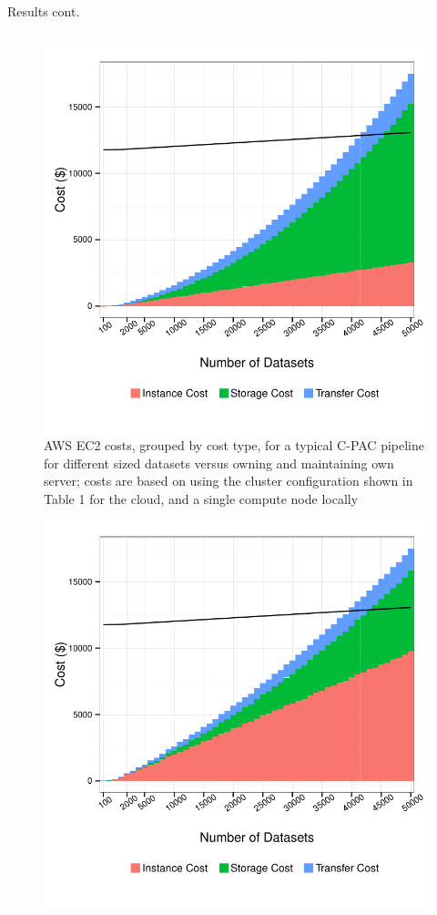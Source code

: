 \documentclass[final,hyperref={pdfpagelabels=false}]{beamer}
\begin{document}
\begin{frame}
\begin{columns}
\begin{column}{.5\textwidth}
{\begin{block}{Results cont.}
\begin{column}{.47\textwidth}
\begin{figure}
                  \includegraphics[width=.99\textwidth]{cpac-costs.pdf}
                  \caption{\label{fig:cpac-costs}AWS EC2 costs, grouped by cost type, for a typical C-PAC pipeline for different sized datasets versus owning and maintaining own server; costs are based on using the cluster configuration shown in Table 1 for the cloud, and a single compute node locally}
              \end{figure}
              \begin{figure}
                  \includegraphics[width=.99\textwidth]{fs-costs.pdf}

\end{figure}
\end{column}
\end{block}}
\end{column}
\end{columns}
\end{frame}
\end{document}
